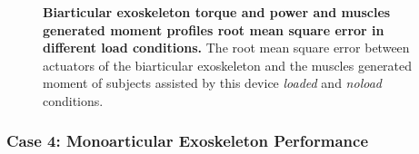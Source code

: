 \documentclass[10pt,letterpaper]{article}
\begin{document}
\begin{figure}[ht!]
	\centering
	\hfil
	\vspace{1mm}
	\caption{\small{\textbf{Biarticular exoskeleton torque and power and muscles generated moment profiles root mean square error in different load conditions.} The root mean square error between actuators of the biarticular exoskeleton and the muscles generated moment of subjects assisted by this device {\it loaded} and {\it noload} conditions.}}
	\label{Fig_Case03_RMSE}
\end{figure}


\subsubsection*{Case 4: Monoarticular Exoskeleton Performance}
\end{document}

